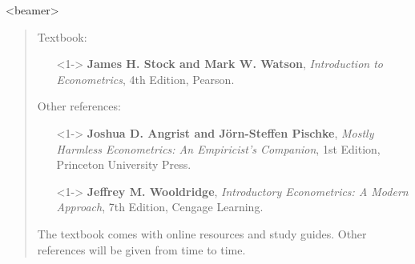 
%

\addtolength{\leftmargini}{\labelsep}


\begin{frame}<beamer>
\titlepage \vspace{-30pt}
\begin{quotation}\justifying\smallfont
\noindent
Textbook: \medskip
\begin{itemize}
\item[]<1-> \textbf{James H. Stock and Mark W. Watson}, \textit{Introduction to Econometrics}, 4th Edition, Pearson.
\end{itemize}
Other references:
\begin{itemize}
\item[]<1-> \textbf{Joshua D. Angrist and J\"{o}rn-Steffen Pischke}, \textit{Mostly Harmless Econometrics: An Empiricist's Companion}, 1st Edition,\\ Princeton University Press.
\item[]<1-> \textbf{Jeffrey M. Wooldridge}, \textit{Introductory Econometrics: A Modern Approach}, 7th Edition, Cengage Learning.
\end{itemize}
The textbook comes with online resources and study guides. Other references will be given from time to time. 
\end{quotation}
\end{frame}


